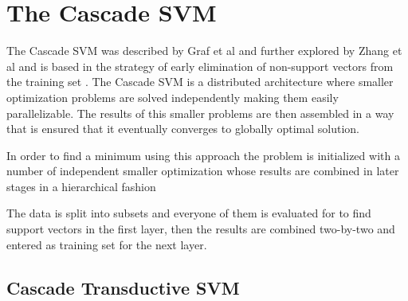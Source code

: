\section{The Cascade SVM}
The Cascade SVM was described by Graf et al \cite{GrafCBDV04} and
further explored by Zhang et al \cite{ZhangZY05} and is based in
the strategy of early elimination of non-support vectors from the
training set \cite{Joachims/99a}. The Cascade SVM is a distributed
architecture where smaller optimization problems are solved independently
making them easily parallelizable. The results of this smaller problems
are then assembled in a way that is ensured that it eventually converges
to globally optimal solution.

In order to find a minimum using this approach the problem is initialized
with a number of independent smaller optimization whose results are
combined in later stages in a hierarchical fashion %

The data is split into subsets and everyone of them is evaluated for to find support vectors in the first layer,
then the results are combined two-by-two and entered as training set
for the next layer. 

\subsection{Cascade Transductive SVM}

